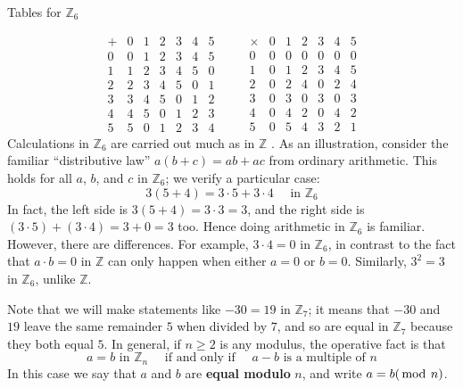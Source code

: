 \begin{center}
	Tables for $\mathbb{Z}_{6}$
\end{center}
\begin{equation*}
	\begin{array}{c|cccccc}
	+ & 0 & 1 & 2 & 3 & 4 & 5 \\ \hline
	0 & 0 & 1 & 2 & 3 & 4 & 5 \\
	1 & 1 & 2 & 3 & 4 & 5 & 0 \\
	2 & 2 & 3 & 4 & 5 & 0 & 1 \\
	3 & 3 & 4 & 5 & 0 & 1 & 2 \\
	4 & 4 & 5 & 0 & 1 & 2 & 3 \\
	5 & 5 & 0 & 1 & 2 & 3 & 4
	\end{array} \quad \quad \begin{array}{c|cccccc}
	\times & 0 & 1 & 2 & 3 & 4 & 5 \\ \hline
	0 & 0 & 0 & 0 & 0 & 0 & 0 \\
	1 & 0 & 1 & 2 & 3 & 4 & 5 \\
	2 & 0 & 2 & 4 & 0 & 2 & 4 \\
	3 & 0 & 3 & 0 & 3 & 0 & 3 \\
	4 & 0 & 4 & 2 & 0 & 4 & 2 \\
	5 & 0 & 5 & 4 & 3 & 2 & 1
	\end{array}
\end{equation*}
Calculations in $\mathbb{Z}_6$ are carried out much as in $\mathbb{Z}$ . As an illustration, consider the familiar ``distributive law''  $a(b+c)=ab+ac$ from ordinary arithmetic. This holds for all $a$, $b$, and $c$ in $\mathbb{Z}_6$; we verify a particular case:
\begin{equation*}
3(5+4) = 3 \cdot 5 + 3 \cdot 4 \quad \mbox{ in } \mathbb{Z}_{6}
\end{equation*}
In fact, the left side is $3(5 + 4) = 3 \cdot 3 = 3$, and the right side is $(3 \cdot 5) + (3 \cdot 4) = 3 + 0 = 3$ too. Hence doing arithmetic in $\mathbb{Z}_6$ is familiar. However, there are differences. For example, $3 \cdot 4 = 0$ in $\mathbb{Z}_6$, in contrast to the fact that $a \cdot b = 0$ in $\mathbb{Z}$ can only happen when either $a = 0$ or $b = 0$. Similarly, $3^{2} = 3$ in $\mathbb{Z}_6$, unlike $\mathbb{Z}$.

Note that we will make statements like $-30 = 19$ in $\mathbb{Z}_7$; it means that $-30$ and $19$ leave the same remainder $5$ when divided by $7$, and so are equal in $\mathbb{Z}_7$ because they both equal $5$. In general, if $n \geq 2$ is any modulus, the operative fact is that
\begin{equation*}
a = b \mbox{ in } \mathbb{Z}_{n} \quad \mbox{ if and only if } \quad a - b \mbox{ is a multiple of } n
\end{equation*}
In this case we say that $a$ and $b$ are \textbf{equal modulo} $n$, and write $a = b (\thinspace\operatorname{mod\medspace} n)$.

